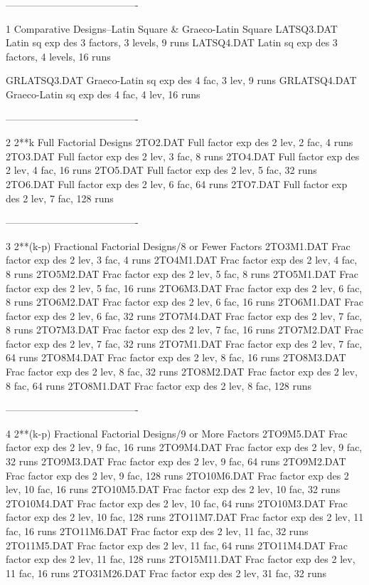 ----------------------------------------
 
1
Comparative Designs--Latin Square & Graeco-Latin Square
      LATSQ3.DAT    Latin sq exp des 3 factors, 3 levels, 9 runs
      LATSQ4.DAT    Latin sq exp des 3 factors, 4 levels, 16 runs
 
      GRLATSQ3.DAT  Graeco-Latin sq exp des 4 fac, 3 lev, 9 runs
      GRLATSQ4.DAT  Graeco-Latin sq exp des 4 fac, 4 lev, 16 runs
 
----------------------------------------
 
2
2**k Full Factorial Designs
      2TO2.DAT      Full factor exp des 2 lev,  2 fac,   4 runs
      2TO3.DAT      Full factor exp des 2 lev,  3 fac,   8 runs
      2TO4.DAT      Full factor exp des 2 lev,  4 fac,  16 runs
      2TO5.DAT      Full factor exp des 2 lev,  5 fac,  32 runs
      2TO6.DAT      Full factor exp des 2 lev,  6 fac,  64 runs
      2TO7.DAT      Full factor exp des 2 lev,  7 fac, 128 runs
 
----------------------------------------
 
3
2**(k-p) Fractional Factorial Designs/8 or Fewer Factors
      2TO3M1.DAT    Frac factor exp des 2 lev,  3 fac,   4 runs
      2TO4M1.DAT    Frac factor exp des 2 lev,  4 fac,   8 runs
      2TO5M2.DAT    Frac factor exp des 2 lev,  5 fac,   8 runs
      2TO5M1.DAT    Frac factor exp des 2 lev,  5 fac,  16 runs
      2TO6M3.DAT    Frac factor exp des 2 lev,  6 fac,   8 runs
      2TO6M2.DAT    Frac factor exp des 2 lev,  6 fac,  16 runs
      2TO6M1.DAT    Frac factor exp des 2 lev,  6 fac,  32 runs
      2TO7M4.DAT    Frac factor exp des 2 lev,  7 fac,   8 runs
      2TO7M3.DAT    Frac factor exp des 2 lev,  7 fac,  16 runs
      2TO7M2.DAT    Frac factor exp des 2 lev,  7 fac,  32 runs
      2TO7M1.DAT    Frac factor exp des 2 lev,  7 fac,  64 runs
      2TO8M4.DAT    Frac factor exp des 2 lev,  8 fac,  16 runs
      2TO8M3.DAT    Frac factor exp des 2 lev,  8 fac,  32 runs
      2TO8M2.DAT    Frac factor exp des 2 lev,  8 fac,  64 runs
      2TO8M1.DAT    Frac factor exp des 2 lev,  8 fac, 128 runs
 
----------------------------------------
 
4
2**(k-p) Fractional Factorial Designs/9 or More Factors
      2TO9M5.DAT    Frac factor exp des 2 lev,  9 fac,  16 runs
      2TO9M4.DAT    Frac factor exp des 2 lev,  9 fac,  32 runs
      2TO9M3.DAT    Frac factor exp des 2 lev,  9 fac,  64 runs
      2TO9M2.DAT    Frac factor exp des 2 lev,  9 fac, 128 runs
      2TO10M6.DAT   Frac factor exp des 2 lev, 10 fac,  16 runs
      2TO10M5.DAT   Frac factor exp des 2 lev, 10 fac,  32 runs
      2TO10M4.DAT   Frac factor exp des 2 lev, 10 fac,  64 runs
      2TO10M3.DAT   Frac factor exp des 2 lev, 10 fac, 128 runs
      2TO11M7.DAT   Frac factor exp des 2 lev, 11 fac,  16 runs
      2TO11M6.DAT   Frac factor exp des 2 lev, 11 fac,  32 runs
      2TO11M5.DAT   Frac factor exp des 2 lev, 11 fac,  64 runs
      2TO11M4.DAT   Frac factor exp des 2 lev, 11 fac, 128 runs
      2TO15M11.DAT  Frac factor exp des 2 lev, 11 fac,  16 runs
      2TO31M26.DAT  Frac factor exp des 2 lev, 31 fac,  32 runs
 
